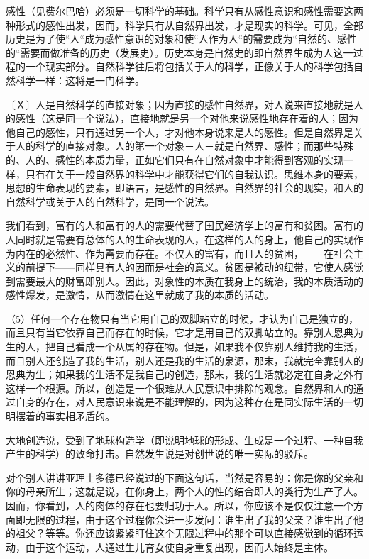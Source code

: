 \documentclass[a4paper,twoside,12pt]{ctexart}
\begin{document}
感性（见费尔巴哈）必须是一切科学的基础。科学只有从感性意识和感性需要这两种形式的感性出发，因而，科学只有从自然界出发，才是现实的科学。可见，全部历史是为了使“人“成为感性意识的对象和使“人作为人“的需要成为“自然的、感性的“需要而做准备的历史（发展史）。历史本身是自然史的即自然界生成为人这一过程的一个现实部分。自然科学往后将包括关于人的科学，正像关于人的科学包括自然科学一样：这将是一门科学。

〔Ｘ〕人是自然科学的直接对象；因为直接的感性自然界，对人说来直接地就是人的感性（这是同一个说法），直接地就是另一个对他来说感性地存在着的人；因为他自己的感性，只有通过另一个人，才对他本身说来是人的感性。但是自然界是关于人的科学的直接对象。人的第一个对象－人－就是自然界、感性；而那些特殊的、人的、感性的本质力量，正如它们只有在自然对象中才能得到客观的实现一样，只有在关于一般自然界的科学中才能获得它们的自我认识。思维本身的要素，思想的生命表现的要素，即语言，是感性的自然界。自然界的社会的现实，和人的自然科学或关于人的自然科学，是同一个说法。

我们看到，富有的人和富有的人的需要代替了国民经济学上的富有和贫困。富有的人同时就是需要有总体的人的生命表现的人，在这样的人的身上，他自己的实现作为内在的必然性、作为需要而存在。不仅人的富有，而且人的贫困，——在社会主义的前提下——同样具有人的因而是社会的意义。贫困是被动的纽带，它使人感觉到需要最大的财富即别人。因此，对象性的本质在我身上的统治，我的本质活动的感性爆发，是激情，从而激情在这里就成了我的本质的活动。

（5）任何一个存在物只有当它用自己的双脚站立的时候，才认为自己是独立的，而且只有当它依靠自己而存在的时候，它才是用自己的双脚站立的。靠别人恩典为生的人，把自己看成一个从属的存在物。但是，如果我不仅靠别人维持我的生活，而且别人还创造了我的生活，别人还是我的生活的泉源，那末，我就完全靠别人的恩典为生；如果我的生活不是我自己的创造，那末，我的生活就必定在自身之外有这样一个根源。所以，创造是一个很难从人民意识中排除的观念。自然界和人的通过自身的存在，对人民意识来说是不能理解的，因为这种存在是同实际生活的一切明摆着的事实相矛盾的。

大地创造说，受到了地球构造学（即说明地球的形成、生成是一个过程、一种自我产生的科学）的致命打击。自然发生说是对创世说的唯一实际的驳斥。

对个别人讲讲亚理士多德已经说过的下面这句话，当然是容易的：你是你的父亲和你的母亲所生；这就是说，在你身上，两个人的性的结合即人的类行为生产了人。因而，你看到，人的肉体的存在也要归功于人。所以，你应该不是仅仅注意一个方面即无限的过程，由于这个过程你会进一步发问：谁生出了我的父亲？谁生出了他的祖父？等等。你还应该紧紧盯住这个无限过程中的那个可以直接感觉到的循环运动，由于这个运动，人通过生儿育女使自身重复出现，因而人始终是主体。
\end{document}
